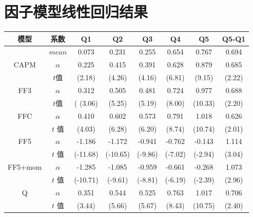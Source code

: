 \chapter{因子模型线性回归结果}\label{linear}
\begin{table}[htbp]
\label{factor_linear}
\begin{tabular*}{\hsize}{@{\hskip\tabcolsep\extracolsep\fill}*{8}{c}}
\toprule
模型                       & 系数                    & Q1 & Q2 & Q3 & Q4 & Q5 & Q5-Q1 \\ \midrule
 & $mean$& 0.073& 0.231&0.255&0.654& 0.767&  0.694\\
 \multirow{2}{*}{CAPM}     & $\alpha$ &    0.225 &    0.415&    0.391&    0.628&    0.879&   0.685\\
                         & $t$值                     &    (2.18)         &   (4.26)         &   (4.16)         &   (6.81)         &   (9.15)     & (2.22)     \\
\multirow{2}{*}{FF3}     & $\alpha$ &     0.312&    0.505&    0.481&    0.724&    0.977&  0.688\\
                         &$ t$值                     &    ( (3.06)         &   (5.25)         &   (5.19)         &   (8.00)         &  (10.33)      &(2.20)    \\
\multirow{2}{*}{FFC}     & $\alpha$  &  0.410&    0.602&    0.573&    0.791&    1.018& 0.626\\
                         & $t$ 值                   &    (4.03)         &   (6.28)         &   (6.20)         &   (8.74)         &  (10.74)  &(2.01)       \\
\multirow{2}{*}{FF5}     &$\alpha$  & -1.186&   -1.172&   -0.941&   -0.762&   -0.143      & 1.114\\
                         & $t$  值                   &    (-11.68)         & (-10.65)         &  (-9.86)         &  (-7.02)         &  (-2.94)    &   (3.04)   \\
\multirow{2}{*}{FF5+mom} &$\alpha$  &   -1.285&   -1.085&   -0.959&   -0.661&   -0.268& 1.073  \\
                         & $t$  值        &      (-10.71)         &  (-9.61)         &  (-8.81)         &  (-6.19)         &  (-2.39)       &(2.96)   \\
\multirow{2}{*}{Q}       &$\alpha$  &   0.351&    0.544&    0.525&    0.763&    1.017&0.706\\
                         & $t  $ 值                  &     (3.44)         &   (5.66)         &   (5.67)         &   (8.43)         &  (10.75)        &(2.40)    \\ \bottomrule
\end{tabular*}
\end{table}
